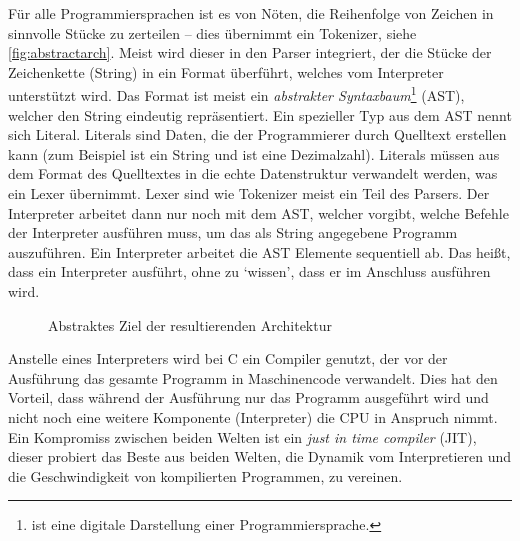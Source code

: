      Für alle Programmiersprachen ist es von Nöten, die Reihenfolge von Zeichen in sinnvolle Stücke zu zerteilen -- dies übernimmt ein Tokenizer, siehe \autoref{fig:abstractarch}. Meist wird dieser in den Parser \autocite[S.46]{eirund2013formale} integriert, der die Stücke der Zeichenkette (String) in ein Format überführt, welches vom Interpreter unterstützt wird. Das Format ist meist ein \emph{abstrakter Syntaxbaum}\footnote{
         ist eine digitale Darstellung einer Programmiersprache.
      } (AST), welcher den String eindeutig repräsentiert. Ein spezieller Typ aus dem AST nennt sich Literal. Literals sind Daten, die der Programmierer durch Quelltext erstellen kann (zum Beispiel ist  ein String und  ist eine Dezimalzahl). Literals müssen aus dem Format des Quelltextes in die echte Datenstruktur verwandelt werden, was ein Lexer übernimmt. Lexer sind wie Tokenizer meist ein Teil des Parsers. Der Interpreter arbeitet dann nur noch mit dem AST, welcher vorgibt, welche Befehle der Interpreter ausführen muss, um das als String angegebene Programm auszuführen. Ein Interpreter arbeitet die AST Elemente sequentiell ab. Das heißt, dass ein Interpreter  ausführt, ohne zu `wissen', dass er im Anschluss  ausführen wird.
      \begin{figure}[H]
        \centering
        \caption{Abstraktes Ziel der resultierenden Architektur}
        \label{fig:abstractarch}
      \end{figure}
      Anstelle eines Interpreters wird bei C ein Compiler genutzt, der vor der Ausführung das gesamte Programm in Maschinencode verwandelt. Dies hat den Vorteil, dass während der Ausführung nur das Programm ausgeführt wird und nicht noch eine weitere Komponente (Interpreter) die CPU in Anspruch nimmt. Ein Kompromiss zwischen beiden Welten ist ein \emph{just in time compiler} (JIT), dieser probiert das Beste aus beiden Welten, die Dynamik vom Interpretieren und die Geschwindigkeit von kompilierten Programmen, zu vereinen.

